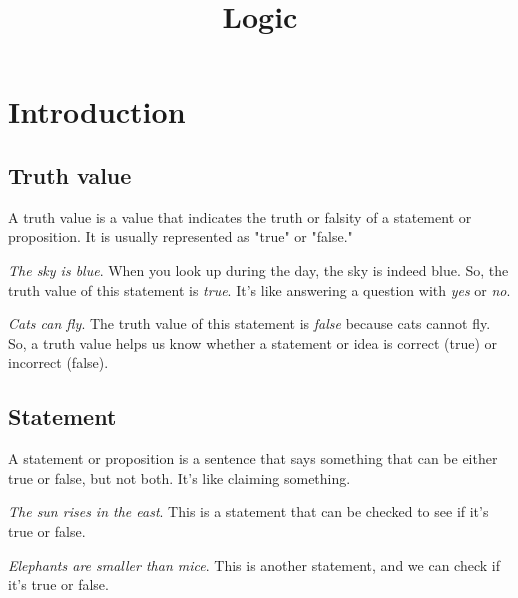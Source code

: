 \documentclass{article}
\title{Logic}
\theoremstyle{mytheoremstyle}
\theoremstyle{mytheoremstyle}
\theoremstyle{myexamplestyle}
\begin{document}
\maketitle

\tableofcontents

\newpage

\section{Introduction}

\subsection{Truth value}

\begin{definition}
    A truth value is a value that indicates the truth or falsity of a statement or proposition. It is usually represented as "true" or "false."
\end{definition}

\begin{example}
    \emph{The sky is blue}. When you look up during the day, the sky is indeed blue. So, the truth value of this statement is \emph{true}. It's like answering a question with \emph{yes} or \emph{no}.
\end{example}

\begin{example}
    \emph{Cats can fly}. The truth value of this statement is \emph{false} because cats cannot fly. So, a truth value helps us know whether a statement or idea is correct (true) or incorrect (false).
\end{example}


\subsection{Statement}

\begin{definition}
    A statement or proposition is a sentence that says something
    that can be either true or false, but not both. It's like
    claiming something.
\end{definition}

\begin{example}
    \emph{The sun rises in the east}. This is a statement that can be checked to see if it's true or false.
\end{example}

\begin{example}
    \emph{Elephants are smaller than mice}. This is another statement, and we can check if it's true or false.
\end{example}
\end{document}
